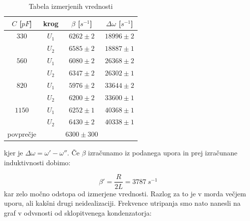 \documentclass[12pt]{article}
\begin{document}
\begin{table}[!ht]
\centering
\begin{tabular}{c|c|c|c}
    $C$ [$pF$] & krog & $\beta$ [$s^{-1}$] & $\Delta  \omega$ [$s^{-1}$] \\\hline \hline

    $330$ & $U_1$ & $6262 \pm 2$ & $18996 \pm 2$\\
    & $U_2$ & $6585\pm 2$ & $18887 \pm 1$\\
    $560$ & $U_1$ & $6080\pm 2$ & $26368\pm 2$\\
    & $U_2$ & $6347\pm 2$ & $26302\pm 1$\\
    $820$ & $U_1$ & $5976\pm 2$ & $33644\pm 2$\\
    & $U_2$ & $6200\pm 2$ & $33600\pm 1$\\
    $1150$ &$U_1$ & $6252\pm 1$ & $40368\pm 1$\\
    & $U_2$ & $6430\pm 2$ & $40338\pm 1$\\\hline \hline
    povprečje && $6300\pm 300$ &
\end{tabular}
\caption{Tabela izmerjenih vrednosti}
\end{table}
kjer je $\Delta \omega = \omega' - \omega''$. Če $\beta$ izračunamo iz podanega upora in prej izračunane induktivnosti dobimo:

$$
\beta' = \frac{R}{2L} = 3787\ s^{-1}
$$
kar zelo močno odstopa od izmerjene vrednosti. Razlog za to je v morda večjem uporu, ali kakšni drugi neidealizaciji. Frekvence utripanja smo nato nanesli na graf v odvsnosti od sklopitvenega kondenzatorja:
\end{document}
